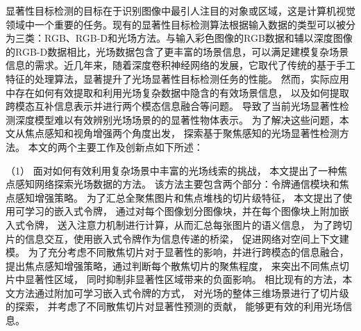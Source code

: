 显著性目标检测的目标在于识别图像中最引人注目的对象或区域，这是计算机视觉领域中一个重要的任务。现有的显著性目标检测算法根据输入数据的类型可以被分为三类：RGB、RGB-D和光场方法。与输入彩色图像的RGB数据和辅以深度图像的RGB-D数据相比，光场数据包含了更丰富的场景信息，可以满足建模复杂场景信息的需求。近几年来，随着深度卷积神经网络的发展，它取代了传统的基于手工特征的处理算法，显著提升了光场显著性目标检测任务的性能。
%
%
%
%
%
%
然而，实际应用中存在如何有效提取和利用光场复杂数据中隐含的有效场景信息，
以及如何提取跨模态互补信息表示并进行两个模态信息融合等问题。
导致了当前光场显著性检测深度模型难以有效辨别光场场景的的显著性物体表示。
%
%
为了解决这些问题，本文从焦点感知和视角增强两个角度出发，
探索基于聚焦感知的光场显著性检测方法。
本文的两个主要工作及创新点如下所述：









%
%

%


（1）
%
%
面对如何有效利用复杂场景中丰富的光场线索的挑战，
本文提出了一种焦点感知网络探索光场数据的方法。
%
%
该方法主要包含两个部分：令牌通信模块和焦点感知增强策略。
%
%
为了汇总全聚焦图片和焦点堆栈的切片级特征，
本文提出了使用可学习的嵌入式令牌，
通过对每个图像划分图像块，并在每个图像块上附加嵌入式令牌，
送入注意力机制进行计算，从而汇总每张图片的语义信息，
为了跨切片的信息交互，使用嵌入式令牌作为信息传递的桥梁，
促进网络对空间上下文建模。
%
%
为了充分考虑不同散焦切片对于显著性的影响，并进行跨模态的信息融合，
提出焦点感知增强策略，通过判断每个散焦切片的聚焦程度，
来突出不同焦点切片中显著性区域，
同时抑制非显著性区域带来的负面影响。
%
%
相比现有的方法，本文方法通过附加可学习嵌入式令牌的方式，
对光场的整体三维场景进行了切片级的探索，
并考虑了不同散焦切片对显著性预测的贡献，
能够更有效的利用光场信息。







